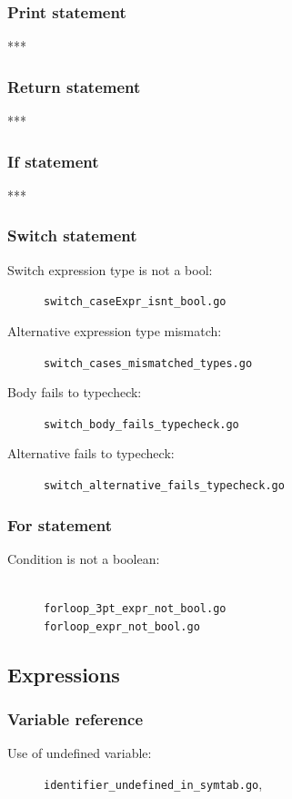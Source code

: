 \documentclass[oneside]{article}
\begin{document}
\subsubsection{Print statement}
***

\subsubsection{Return statement}
***

\subsubsection{If statement}
***

\subsubsection{Switch statement}
\begin{description}
  \item[Switch expression type is not a bool:] \verb|switch_caseExpr_isnt_bool.go|
  \item[Alternative expression type mismatch:] \verb|switch_cases_mismatched_types.go|
  \item[Body fails to typecheck:] \verb|switch_body_fails_typecheck.go|
  \item[Alternative fails to typecheck:] \verb|switch_alternative_fails_typecheck.go|
\end{description}

\subsubsection{For statement}

\begin{description}
  \item[Condition is not a boolean:] \ \\
    \verb|forloop_3pt_expr_not_bool.go| \\
    \verb|forloop_expr_not_bool.go|
\end{description}


\subsection{Expressions}

\subsubsection{Variable reference}
\begin{description}
  \item[Use of undefined variable:] \verb|identifier_undefined_in_symtab.go|,
\end{description}
\end{document}
